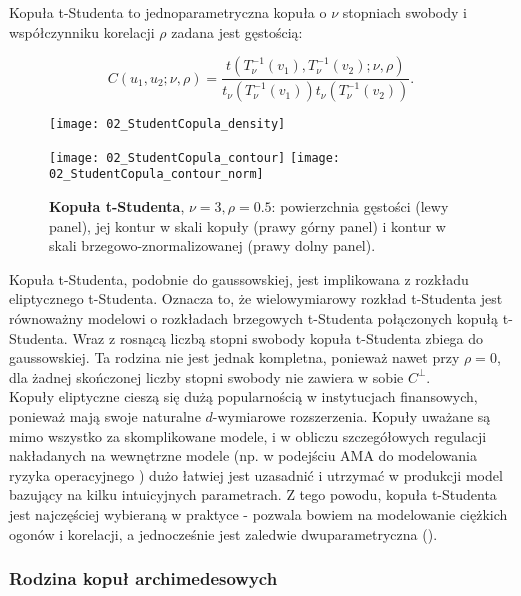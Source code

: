 \begin{df}
	Kopuła t-Studenta to jednoparametryczna kopuła o $\nu$ stopniach swobody i współczynniku korelacji $\rho$ zadana jest gęstością:
	
	$$ C(u_1, u_2;\nu,\rho) = \frac{t(T_{\nu}^{-1}(v_1), T_{\nu}^{-1}(v_2);\nu,\rho)}{t_{\nu}(T_{\nu}^{-1}(v_1))t_{\nu}(T_{\nu}^{-1}(v_2))}.$$
\end{df}
\begin{figure}[h]
	\centering
	\begin{minipage}{0.5\linewidth}
		\texttt{[image: 02\_StudentCopula\_density]}
	\end{minipage}
	\begin{minipage}{0.45\linewidth}
		\texttt{[image: 02\_StudentCopula\_contour]}
		\texttt{[image: 02\_StudentCopula\_contour\_norm]}
	\end{minipage}
	\caption{\textbf{Kopuła t-Studenta}, $\nu=3, \rho=0.5$: powierzchnia gęstości (lewy panel), jej kontur w skali kopuły (prawy górny panel) i kontur w skali brzegowo-znormalizowanej (prawy dolny panel). \label{fig:student_copula_density}}
\end{figure}
Kopuła t-Studenta, podobnie do gaussowskiej, jest implikowana z rozkładu eliptycznego t-Studenta. Oznacza to, że wielowymiarowy rozkład t-Studenta jest równoważny modelowi o rozkładach brzegowych t-Studenta połączonych kopułą t-Studenta. Wraz z rosnącą liczbą stopni swobody kopuła t-Studenta zbiega do gaussowskiej. Ta rodzina nie jest jednak kompletna, ponieważ nawet przy $\rho=0$, dla żadnej skończonej liczby stopni swobody nie zawiera w sobie $C^{\perp}$.\\

Kopuły eliptyczne cieszą się dużą popularnością w instytucjach finansowych, ponieważ mają swoje naturalne $d$-wymiarowe rozszerzenia. Kopuły uważane są mimo wszystko za skomplikowane modele, i w obliczu szczegółowych regulacji nakładanych na wewnętrzne modele (np. w podejściu AMA do modelowania ryzyka operacyjnego \cite{BaselII}) dużo łatwiej jest uzasadnić i utrzymać w produkcji model bazujący na kilku intuicyjnych parametrach. Z tego powodu, kopuła t-Studenta jest najczęściej wybieraną w praktyce - pozwala bowiem na modelowanie ciężkich ogonów i korelacji, a jednocześnie jest zaledwie dwuparametryczna (\cite{OpRisk}).\\

\subsubsection{Rodzina kopuł archimedesowych}

